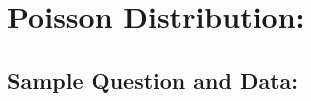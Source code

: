 \documentclass[12pt]{article}
\begin{document}
\section*{Poisson Distribution:}

\subsection*{Sample Question and Data:}



\end{document}
